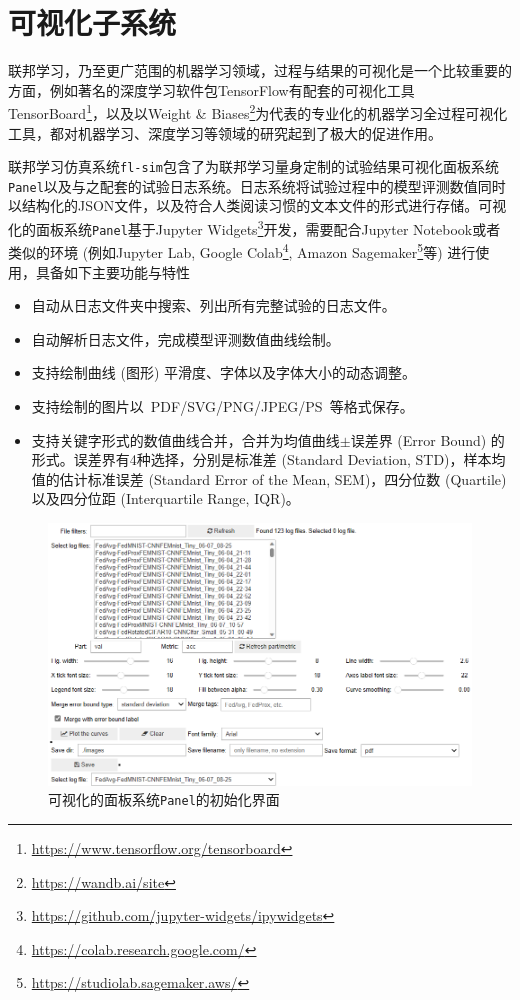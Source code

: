 \section{可视化子系统}
\label{sec:chap5-viz}


联邦学习，乃至更广范围的机器学习领域，过程与结果的可视化是一个比较重要的方面，例如著名的深度学习软件包TensorFlow\cite{tensorflow}有配套的可视化工具TensorBoard\footnote{\url{https://www.tensorflow.org/tensorboard}}，以及以Weight \& Biases\footnote{\url{https://wandb.ai/site}}为代表的专业化的机器学习全过程可视化工具，都对机器学习、深度学习等领域的研究起到了极大的促进作用。

联邦学习仿真系统\texttt{fl-sim}包含了为联邦学习量身定制的试验结果可视化面板系统\texttt{Panel}以及与之配套的试验日志系统。日志系统将试验过程中的模型评测数值同时以结构化的JSON文件，以及符合人类阅读习惯的文本文件的形式进行存储。可视化的面板系统\texttt{Panel}基于Jupyter Widgets\footnote{\url{https://github.com/jupyter-widgets/ipywidgets}}开发，需要配合Jupyter Notebook\cite{jupyter_2016}或者类似的环境 (例如Jupyter Lab\cite{Granger_2021_Jupyter}, Google Colab\footnote{\url{https://colab.research.google.com/}}, Amazon Sagemaker\footnote{\url{https://studiolab.sagemaker.aws/}}等) 进行使用，具备如下主要功能与特性
\begin{itemize}
    \item 自动从日志文件夹中搜索、列出所有完整试验的日志文件。
    \item 自动解析日志文件，完成模型评测数值曲线绘制。
    \item 支持绘制曲线 (图形) 平滑度、字体以及字体大小的动态调整。
    \item 支持绘制的图片以~PDF/SVG/PNG/JPEG/PS~等格式保存。
    \item 支持关键字形式的数值曲线合并，合并为均值曲线$\pm$误差界 (Error Bound) 的形式。误差界有4种选择，分别是标准差 (Standard Deviation, STD)，样本均值的估计标准误差 (Standard Error of the Mean, SEM)，四分位数 (Quartile)以及四分位距 (Interquartile Range, IQR)。
\end{itemize}

\begin{figure}[ht]
    \centering
    \includegraphics[width=\textwidth]{figures/panel-init.png}
    \caption{可视化的面板系统\texttt{Panel}的初始化界面}
    \label{fig:panel-init}
\end{figure}

